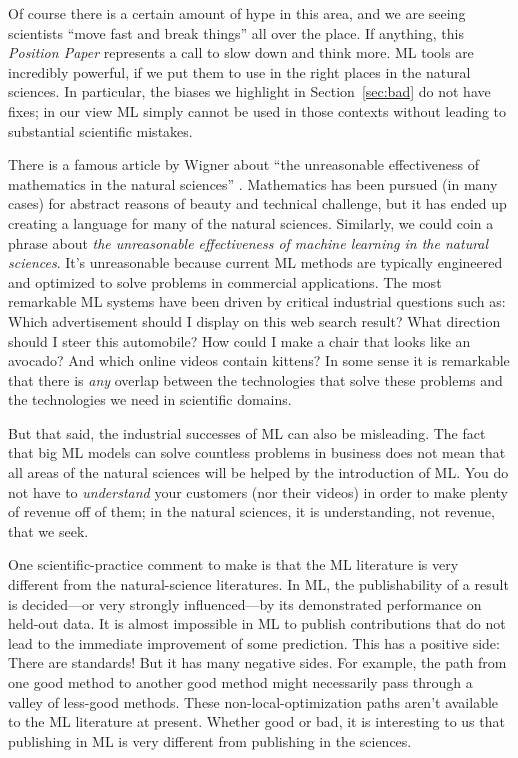 \documentclass{article}
\newcommand{\documentname}{\textsl{Position Paper}}
\newcommand{\sectionname}{Section}
\newcommand{\secref}[1]{\sectionname~\ref{#1}}
\begin{document}
Of course there is a certain amount of hype in this area, and we are seeing scientists ``move fast and break things'' all over the place.
If anything, this \documentname{} represents a call to slow down and think more.
ML tools are incredibly powerful, if we put them to use in the right places in the natural sciences.
In particular, the biases we highlight in \secref{sec:bad} do not have fixes; in our view ML simply cannot be used in those contexts without leading to substantial scientific mistakes.

There is a famous article by Wigner about ``the unreasonable effectiveness of mathematics in the natural sciences'' \cite{wigner}.
Mathematics has been pursued (in many cases) for abstract reasons of beauty and technical challenge, but it has ended up creating a language for many of the natural sciences.
Similarly, we could coin a phrase about \emph{the unreasonable effectiveness of machine learning in the natural sciences}.
It's unreasonable because current ML methods are typically engineered and optimized to solve problems in commercial applications.
The most remarkable ML systems have been driven by critical industrial questions such as:
Which advertisement should I display on this web search result?
What direction should I steer this automobile?
How could I make a chair that looks like an avocado?
And which online videos contain kittens?
In some sense it is remarkable that there is \emph{any} overlap between the technologies that solve these problems and the technologies we need in scientific domains.

But that said, the industrial successes of ML can also be misleading.
The fact that big ML models can solve countless problems in business does not mean that all areas of the natural sciences will be helped by the introduction of ML.
You do not have to \emph{understand} your customers (nor their videos) in order to make plenty of revenue off of them; in the natural sciences, it is understanding, not revenue, that we seek.

One scientific-practice comment to make is that the ML literature is very different from the natural-science literatures.
In ML, the publishability of a result is decided---or very strongly influenced---by its demonstrated performance on held-out data.
It is almost impossible in ML to publish contributions that do not lead to the immediate improvement of some prediction.
This has a positive side: There are standards!
But it has many negative sides.
For example, the path from one good method to another good method might necessarily pass through a valley of less-good methods.
These non-local-optimization paths aren't available to the ML literature at present.
Whether good or bad, it is interesting to us that publishing in ML is very different from publishing in the sciences.
\end{document}
